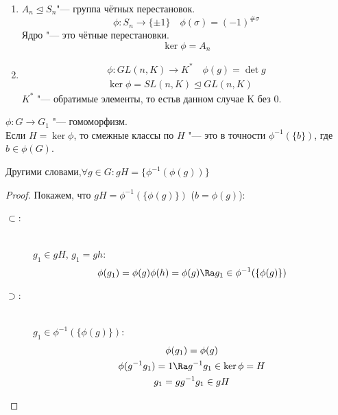 \begin{exmp}\hfill\begin{enumerate}
\item
	$A_n \unlhd S_n$"--- группа чётных перестановок.
	\[ \phi\colon S_n \to \{\pm 1\} \quad \phi(\sigma) = (-1)^{\#\sigma} \]
	Ядро "--- это чётные перестановки.
	\[ \ker \phi = A_n \]

\item
	\begin{gather*}
		\phi\colon GL(n,K) \to K^* \quad \phi(g) = \det g \\
		\ker \phi = SL(n, K) \unlhd GL(n, K)
	\end{gather*}
	$K^*$ "--- обратимые элементы, то естьв данном случае K без 0.
\end{enumerate}\end{exmp}

\begin{lemma}
	$\phi\colon G \to G_1$ "--- гомоморфизм.\\
	Если $H = \ker \phi$, то смежные классы по $H$ "--- это в точности $\phi^{-1}(\{b\})$, где $b \in \phi(G)$.
        
        Другими словами,$\forall g \in G \colon gH = \{\phi^{-1}(\phi(g))\}$\\
\end{lemma}
\begin{proof}
	Покажем, что $gH = \phi^{-1}(\{\phi(g)\})$ ($b = \phi(g)$):
	\begin{description}
	\item[$\subset$:] \hfill \\
		$g_1 \in gH$, $g_1 = gh$:
		\[ \phi(g_1) = \phi(g)\phi(h) = \phi(g) \Ra \\ g_1 \in \phi^{-1}(\{\phi(g)\}) \]

	\item[$\supset$:]\hfill \\
		$g_1 \in \phi^{-1}(\{\phi(g)\})$:
		\begin{gather*}
			\phi(g_1) = \phi(g) \\
			\phi(g^{-1}g_1) = 1 \Ra g^{-1}g_1 \in \ker \phi = H \\
			g_1 = gg^{-1}g_1 \in gH
		\end{gather*}
	\end{description}
\end{proof}

